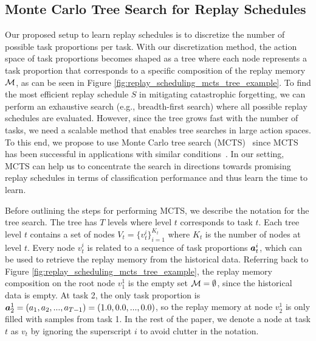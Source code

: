 
\subsection{Monte Carlo Tree Search for Replay Schedules}
\label{paperC:sec:mcts_for_replay_scheduling}


Our proposed setup to learn %
replay schedules is to discretize the number of possible task proportions per task. 
With our discretization method, the action space of task proportions becomes shaped as a tree where each node represents a task proportion that corresponds to a specific composition of the replay memory ${\mathcal{M}}$, as can be seen in Figure \ref{fig:replay_scheduling_mcts_tree_example}. 
To find the most efficient replay schedule $S$ in mitigating catastrophic forgetting, we can perform an exhaustive search (e.g., breadth-first search) where all possible replay schedules are evaluated. 
However, since the tree grows fast with the number of tasks, we need a scalable method that enables tree searches in large action spaces. To this end, we propose to use Monte Carlo tree search (MCTS)~ since MCTS has been successful in applications with similar conditions~.
In our setting, MCTS can help us to concentrate the search in directions towards promising replay schedules in terms of classification performance and thus learn the time to learn.

%

Before outlining the steps for performing MCTS, we describe the notation for the tree search. The tree has $T$ levels where level $t$ corresponds to task $t$. Each tree level $t$ contains a set of nodes $V_t = \{v_t^{i}\}_{i=1}^{K_t}$ where $K_t$ is the number of nodes at level $t$. 
Every node $v_t^{i}$ is related to a sequence of task proportions ${\bm{a}}_{t}^{i}$, which can be used to retrieve the replay memory from the historical data. 
Referring back to Figure \ref{fig:replay_scheduling_mcts_tree_example}, the replay memory composition on the root node $v_1^1$ is the empty set ${\mathcal{M}} = \emptyset$, since the historical data is empty. At task 2, the only task proportion is ${\bm{a}}_{2}^1 = (a_1, a_2, ..., a_{T-1}) = (1.0, 0.0, ..., 0.0)$, so the replay memory at node $v_2^1$ is only filled with samples from task 1. In the rest of the paper, we denote a node at task $t$ as $v_t$ by ignoring the superscript $i$ to avoid clutter in the notation. 

